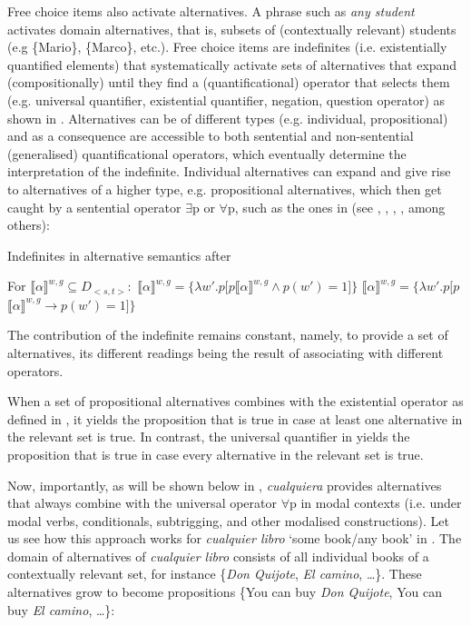Free choice items also activate alternatives. A phrase such as \textit{any student} activates domain alternatives, that is, subsets of (contextually relevant) students (e.g \{Mario\}, \{Marco\}, etc.). Free choice items are indefinites (i.e. existentially quantified elements) that systematically activate sets of alternatives that expand (compositionally) until they find a (quantificational) operator that selects them (e.g. universal quantifier, existential quantifier, negation, question operator) as shown in . Alternatives can be of different types (e.g. individual, propositional) and as a consequence are accessible to both sentential and non-sentential (generalised) quantificational operators, which eventually determine the interpretation of the indefinite. Individual alternatives can expand and give rise to alternatives of a higher type, e.g. propositional alternatives, which then get caught by a sentential operator ${\exists}$p or ${\forall}$p, such as the ones in  (see \citealt{Kratzer2002}, \citealt{Chierchia2006}, \citealt{Aloni2007}, \citealt{Alonso-OvalleMenéndez-Benito2011}, among others):

\ea %
\label{bkm:Ref533761448}  Indefinites in alternative semantics after \citet[8]{Kratzer2002}

  For $⟦α⟧^{w,g} ⊆  D_{<s,t>}:$
\ea{} $⟦α ⟧^{w,g}=\{λw′.${\exists}$p [p${\in}$⟦α⟧^{w,g} \wedge  p(w′) = 1]\}$
\ex{} $⟦α ⟧^{w,g}=\{λw′.${\forall}$p [p${\in}$⟦α⟧^{w,g} →       p(w′) = 1]\}$
\z
\z

The contribution of the indefinite remains constant, namely, to provide a set of alternatives, its different readings being the result of associating with different operators.

When a set of propositional alternatives combines with the existential operator as defined in , it yields the proposition that is true in case at least one alternative in the relevant set is true. In contrast, the universal quantifier in  yields the proposition that is true in case every alternative in the relevant set is true.

Now, importantly, as will be shown below in , \textit{cualquiera} provides alternatives that always combine with the universal operator ${\forall}$p in modal contexts (i.e. under modal verbs, conditionals, subtrigging, and other modalised constructions). Let us see how this approach works for \textit{cualquier libro} ‘some book/any book’ in . The domain of alternatives of \textit{cualquier libro} consists of all individual books of a contextually relevant set, for instance \{\textit{Don Quijote}, \textit{El camino}, …\}. These alternatives grow to become propositions \{You can buy \textit{Don Quijote}, You can buy \textit{El camino}, …\}:

